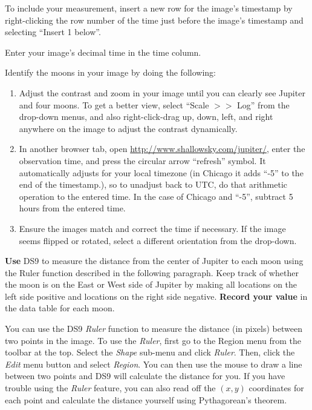 \begin{steps}
	\item To include your measurement, insert a new row for the image's timestamp by right-clicking the row number of the time just before the image's timestamp and selecting ``Insert 1 below''.
	
	\item Enter your image's decimal time in the time column.

	\item Identify the moons in your image by doing the following:
	\begin{enumerate}
		\item Adjust the contrast and zoom in your image until you can clearly see Jupiter and four moons. To get a better view, select ``Scale $>>$ Log'' from the drop-down menus, and also right-click-drag up, down, left, and right anywhere on the image to adjust the contrast dynamically.
		
		\item In another browser tab, open \url{http://www.shallowsky.com/jupiter/}, enter the observation time, and press the circular arrow ``refresh'' symbol. It automatically adjusts for your local timezone (in Chicago it adds ``-5'' to the end of the timestamp.), so to unadjust back to UTC, do that arithmetic operation to the entered time. In the case of Chicago and ``-5'', subtract 5 hours from the entered time.
		
		\item Ensure the images match and correct the time if necessary. If the image seems flipped or rotated, select a different orientation from the drop-down.
	\end{enumerate}
	
	\item \textbf{Use} DS9 to measure the distance from the center of Jupiter to each moon using the Ruler function described in the following paragraph. Keep track of whether the moon is on the East or West side of Jupiter by making all locations on the left side positive and locations on the right side negative. \textbf{Record your value} in the data table for each moon.
\end{steps}

You can use the DS9 \textit{Ruler} function to measure the distance (in pixels) between two points in the image. To use the \textit{Ruler}, first go to the Region menu from the toolbar at the top. Select the \textit{Shape} sub-menu and click \textit{Ruler}. Then, click the \textit{Edit} menu button and select \textit{Region}. You can then use the mouse to draw a line between two points and DS9 will calculate the distance for you. If you have trouble using the \textit{Ruler} feature, you can also read off the $(x,y)$ coordinates for each point and calculate the distance yourself using Pythagorean's theorem.

